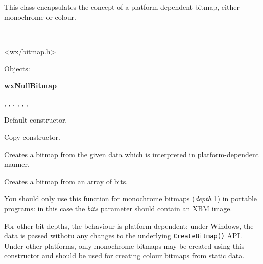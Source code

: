 \section{}\label{wxbitmap}

%
This class encapsulates the concept of a platform-dependent bitmap,
either monochrome or colour.


\\


<wx/bitmap.h>


Objects:

{\bf wxNullBitmap}


,
,
,
, , ,


\label{wxbitmapconstr}


Default constructor.


Copy constructor.


Creates a bitmap from the given data which is interpreted in platform-dependent
manner.


Creates a bitmap from an array of bits.

You should only use this function for monochrome bitmaps ({\it depth} 1) in
portable programs: in this case the {\it bits} parameter should contain an XBM
image.

For other bit depths, the behaviour is platform dependent: under Windows, the
data is passed withotu any changes to the underlying {\tt CreateBitmap()} API.
Under other platforms, only monochrome bitmaps may be created using this
constructor and  should be used for creating colour
bitmaps from static data.

